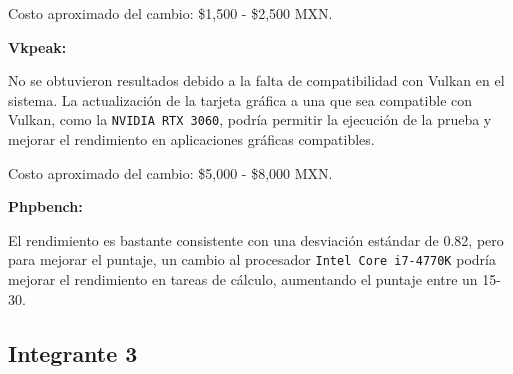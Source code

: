 \documentclass[12pt]{article}
\begin{document}
\begin{enumerate}[label=(\arabic{section}.\arabic{subsection}.\arabic{enumi})]
Costo aproximado del cambio:  \$1,500 -  \$2,500 MXN.

\textbf{Vkpeak:}

No se obtuvieron resultados debido a la falta de compatibilidad con Vulkan en el sistema. La actualización de la tarjeta gráfica a una que sea compatible con Vulkan, como la \texttt{NVIDIA RTX 3060}, podría permitir la ejecución de la prueba y mejorar el rendimiento en aplicaciones gráficas compatibles.

Costo aproximado del cambio:  \$5,000 -  \$8,000 MXN.

\textbf{Phpbench:}

El rendimiento es bastante consistente con una desviación estándar de 0.82, pero para mejorar el puntaje, un cambio al procesador \texttt{Intel Core i7-4770K} podría mejorar el rendimiento en tareas de cálculo, aumentando el puntaje entre un 15-30.
\end{enumerate}

\subsection{Integrante 3}
\end{document}
